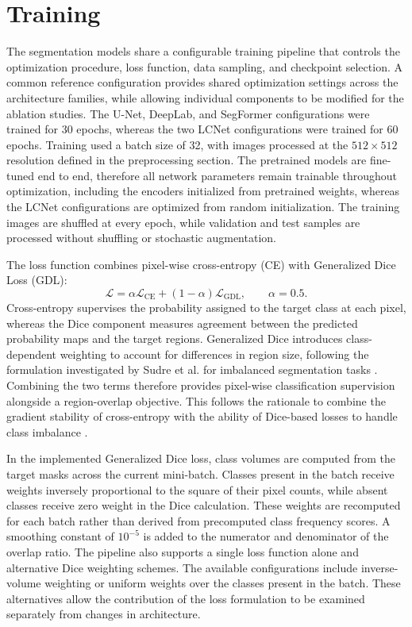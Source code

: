\section{Training}

The segmentation models share a configurable training pipeline that controls the optimization procedure, loss function, data sampling, and checkpoint selection. A common reference configuration provides shared optimization settings across the architecture families, while allowing individual components to be modified for the ablation studies. The U-Net, DeepLab, and SegFormer configurations were trained for 30 epochs, whereas the two LCNet configurations were trained for 60 epochs. Training used a batch size of 32, with images processed at the \(512 \times 512\) resolution defined in the preprocessing section. The pretrained models are fine-tuned end to end, therefore all network parameters remain trainable throughout optimization, including the encoders initialized from pretrained weights, whereas the LCNet configurations are optimized from random initialization. The training images are shuffled at every epoch, while validation and test samples are processed without shuffling or stochastic augmentation.

The loss function combines pixel-wise cross-entropy (CE) with Generalized Dice Loss (GDL):
\begin{equation}
    \mathcal{L}
    =
    \alpha \mathcal{L}_{\mathrm{CE}}
    +
    (1-\alpha)\mathcal{L}_{\mathrm{GDL}},
    \qquad \alpha = 0.5.
    \label{eq}
\end{equation}
Cross-entropy supervises the probability assigned to the target class at each pixel, whereas the Dice component measures agreement between the predicted probability maps and the target regions. Generalized Dice introduces class-dependent weighting to account for differences in region size, following the formulation investigated by Sudre et al. for imbalanced segmentation tasks \cite{sudre2017generalizeddice}. Combining the two terms therefore provides pixel-wise classification supervision alongside a region-overlap objective. This follows the rationale to combine the gradient stability of cross-entropy with the ability of Dice-based losses to handle class imbalance \cite{yeung2022unified}.

In the implemented Generalized Dice loss, class volumes are computed from the target masks across the current mini-batch. Classes present in the batch receive weights inversely proportional to the square of their pixel counts, while absent classes receive zero weight in the Dice calculation. These weights are recomputed for each batch rather than derived from precomputed class frequency scores. A smoothing constant of \(10^{-5}\) is added to the numerator and denominator of the overlap ratio. The pipeline also supports a single loss function alone and alternative Dice weighting schemes. The available configurations include inverse-volume weighting or uniform weights over the classes present in the batch. These alternatives allow the contribution of the loss formulation to be examined separately from changes in architecture.

